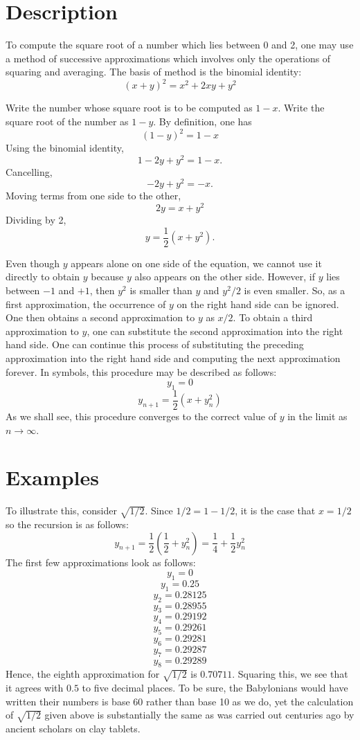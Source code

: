 \documentclass[12pt]{article}
\begin{document}
\section{Description}

To compute the square root of a number which lies between 0 and 2, one may use a method of successive approximations which involves only the operations of squaring and averaging.  The basis of method is the binomial identity:
 \[ (x+y)^2 = x^2 + 2xy + y^2 \]

Write the number whose square root is to be computed as $1 - x$.  Write the square root of the number as $1 - y$. By definition, one has
 \[ (1 - y)^2 = 1 - x \]
Using the binomial identity,
 \[ 1 - 2 y + y^2 = 1 - x .\]
Cancelling,
 \[ - 2 y + y^2 = -x .\]
Moving terms from one side to the other,
 \[ 2 y = x + y^2 \]
Dividing by 2,
 \[ y = \frac{1}{2} (x + y^2) .\]

Even though $y$ appears alone on one side of the equation, we cannot use it directly to obtain $y$ because $y$ also appears on the other side.  However, if $y$ lies between $-1$ and $+1$, then $y^2$ is smaller than $y$ and $y^2 /2$ is even smaller.  So, as a first approximation, the occurrence of $y$ on the right hand side can be ignored.  One then obtains a second approximation to $y$ as $x/2$.  To obtain a third approximation to $y$, one can substitute the second approximation into the right hand side.  One can continue this process of substituting the preceding approximation into the right hand side and computing the next approximation forever.  In symbols, this procedure may be described as follows:
 \[ y_1 = 0 \]
 \[ y_{n+1} = \frac{1}{2} (x + y_n^2) \]
As we shall see, this procedure converges to the correct value of $y$ in the limit as $n \to \infty$.

\section{Examples}

To illustrate this, consider $\sqrt{1/2}$.  Since $1/2 = 1 - 1/2$, it is the case that $x = 1/2$ so the recursion is as follows:
 \[ y_{n+1} = \frac{1}{2} (\frac{1}{2} + y_n^2) = \frac{1}{4} + \frac{1}{2} y_n^2 \]
The first few approximations look as follows:
 \[ y_1 = 0 \]
 \[ y_1 = 0.25 \]
 \[ y_2 = 0.28125 \]
 \[ y_3 = 0.28955 \]
 \[ y_4 = 0.29192 \]
 \[ y_5 = 0.29261 \]
 \[ y_6 = 0.29281 \]
 \[ y_7 = 0.29287 \]
 \[ y_8 = 0.29289 \]
Hence, the eighth approximation for $\sqrt{1/2}$ is $0.70711$.  Squaring this, we see that it agrees with $0.5$ to five decimal places.  To be sure, the Babylonians would have written their numbers is base 60 rather than base 10 as we do, yet the calculation of $\sqrt{1/2}$ given above is substantially the same as was carried out centuries ago by ancient scholars on clay tablets.
\end{document}
